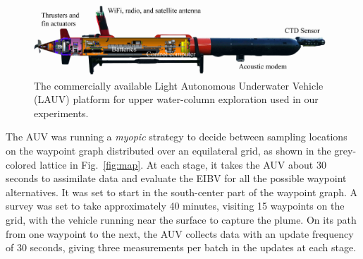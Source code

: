 \documentclass[aoas,preprint]{imsart}
\begin{document}
\begin{figure}[!h] 
\centering 
\includegraphics[width=0.98\textwidth]{Figures/web/harald.jpeg}
\caption{The commercially available Light Autonomous Underwater
  Vehicle (LAUV) platform for upper water-column exploration used in
  our experiments.}
\label{fig:lauv}
\end{figure} 

The AUV was running a \textit{myopic} strategy to decide between
sampling locations on the waypoint graph distributed over an
equilateral grid, as shown in the grey-colored lattice in
Fig.~\ref{fig:map}.  At each stage, it takes the AUV about 30 seconds
to assimilate data and evaluate the EIBV for all the possible waypoint alternatives.  It
was set to start in the south-center part of the waypoint graph. A
survey was set to take approximately 40 minutes, visiting 15 waypoints
on the grid, with the vehicle running near the surface to capture the
plume. On its path from one waypoint to the next, the AUV collects
data with an update frequency of 30 seconds, giving three measurements
per batch in the updates at each stage.
\end{document}

